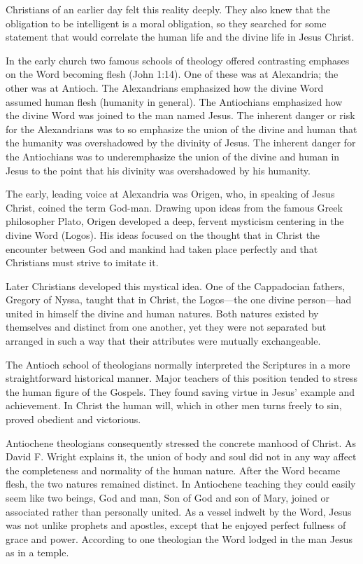 Christians of an earlier day felt this reality deeply. They also knew that the obligation to be
intelligent is a moral obligation, so they searched for some statement that would correlate the
human life and the divine life in Jesus Christ.

In the early church two famous schools of theology offered contrasting emphases on the Word becoming
flesh (John 1:14). One of these was at Alexandria; the other was at Antioch. The Alexandrians
emphasized how the divine Word assumed human flesh (humanity in general). The Antiochians emphasized
how the divine Word was joined to the man named Jesus. The inherent danger or risk for the
Alexandrians was to so emphasize the union of the divine and human that the humanity was
overshadowed by the divinity of Jesus. The inherent danger for the Antiochians was to underemphasize
the union of the divine and human in Jesus to the point that his divinity was overshadowed by his
humanity.

The early, leading voice at Alexandria was Origen, who, in speaking of Jesus Christ, coined the term
God-man. Drawing upon ideas from the famous Greek philosopher Plato, Origen developed a deep,
fervent mysticism centering in the divine Word (Logos). His ideas focused on the thought that in
Christ the encounter between God and mankind had taken place perfectly and that Christians must
strive to imitate it.

Later Christians developed this mystical idea. One of the Cappadocian fathers, Gregory of Nyssa,
taught that in Christ, the Logos—the one divine person—had united in himself the divine and human
natures. Both natures existed by themselves and distinct from one another, yet they were not
separated but arranged in such a way that their attributes were mutually exchangeable.

The Antioch school of theologians normally interpreted the Scriptures in a more straightforward
historical manner. Major teachers of this position tended to stress the human figure of the Gospels.
They found saving virtue in Jesus’ example and achievement. In Christ the human will, which in other
men turns freely to sin, proved obedient and victorious.

Antiochene theologians consequently stressed the concrete manhood of Christ. As David F. Wright
explains it, the union of body and soul did not in any way affect the completeness and normality of
the human nature. After the Word became flesh, the two natures remained distinct. In Antiochene
teaching they could easily seem like two beings, God and man, Son of God and son of Mary, joined or
associated rather than personally united. As a vessel indwelt by the Word, Jesus was not unlike
prophets and apostles, except that he enjoyed perfect fullness of grace and power. According to one
theologian the Word lodged in the man Jesus as in a temple.


